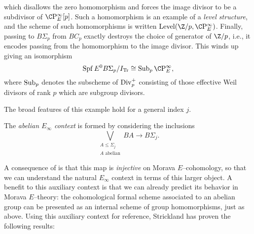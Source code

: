 \begin{example}
\begin{center}
\end{center}
which disallows the zero homomorphism and forces the image divisor to be a subdivisor of \(\CP^\infty_E[p]\).  Such a homomorphism is an example of a \textit{level structure}, and the scheme of such homomorphisms is written \(\Level(\Z/p, \CP^\infty_E)\).  Finally, passing to \(B\Sigma_p\) from \(BC_p\) exactly destroys the choice of generator of \(\Z/p\), i.e., it encodes passing from the homomorphism to the image divisor.  This winds up giving an isomorphism \[\Spf E^0 B\Sigma_p / I_{\Tr} \cong \Sub_p \CP^\infty_E,\] where \(\operatorname{Sub}_p\) denotes the subscheme of \(\operatorname{Div}_p^+\) consisting of those effective Weil divisors of rank \(p\) which are subgroup divisors.
\end{example}

The broad features of this example hold for a general index \(j\).
\begin{definition}
The \textit{abelian \(E_\infty\) context} is formed by considering the inclusions \[\bigvee_{\substack{A \le \Sigma_j \\ \text{\(A\) abelian}}} BA \to B\Sigma_j.\]
\end{definition}
\noindent A consequence of  is that this map is \emph{injective} on Morava \(E\)--cohomology, so that we can understand the natural \(E_\infty\) context in terms of this larger object.  A benefit to this auxiliary context is that we can already predict its behavior in Morava \(E\)--theory: the cohomological formal scheme associated to an abelian group can be presented as an internal scheme of group homomorphisms, just as above.  Using this auxiliary context for reference, Strickland has proven the following results:

